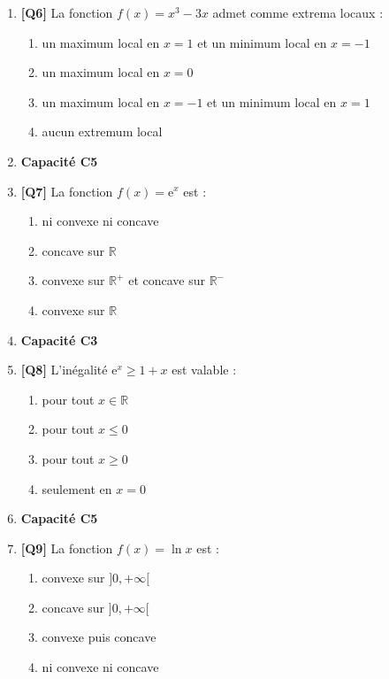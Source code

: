 \begin{enumerate}
\item \textbf{[Q6]} La fonction $f(x) = x^3 - 3x$ admet comme extrema locaux :
  \begin{enumerate}[label=\Alph*.]
    \item un maximum local en $x = 1$ et un minimum local en $x = -1$
    \item un maximum local en $x = 0$
    \item un maximum local en $x = -1$ et un minimum local en $x = 1$
    \item aucun extremum local
  \end{enumerate}

\item[] \textbf{Capacité C5}

\item \textbf{[Q7]} La fonction $f(x) = \mathrm{e}^x$ est :
  \begin{enumerate}[label=\Alph*.]
    \item ni convexe ni concave
    \item concave sur $\mathbb{R}$
    \item convexe sur $\mathbb{R}^+$ et concave sur $\mathbb{R}^-$
    \item convexe sur $\mathbb{R}$
  \end{enumerate}

\item[] \textbf{Capacité C3}

\item \textbf{[Q8]} L'inégalité $\mathrm{e}^x \geq 1 + x$ est valable :
  \begin{enumerate}[label=\Alph*.]
    \item pour tout $x \in \mathbb{R}$
    \item pour tout $x \leq 0$
    \item pour tout $x \geq 0$
    \item seulement en $x = 0$
  \end{enumerate}

\item[] \textbf{Capacité C5}

\item \textbf{[Q9]} La fonction $f(x) = \ln x$ est :
  \begin{enumerate}[label=\Alph*.]
    \item convexe sur $]0, +\infty[$
    \item concave sur $]0, +\infty[$
    \item convexe puis concave
    \item ni convexe ni concave
  \end{enumerate}


\end{enumerate}
